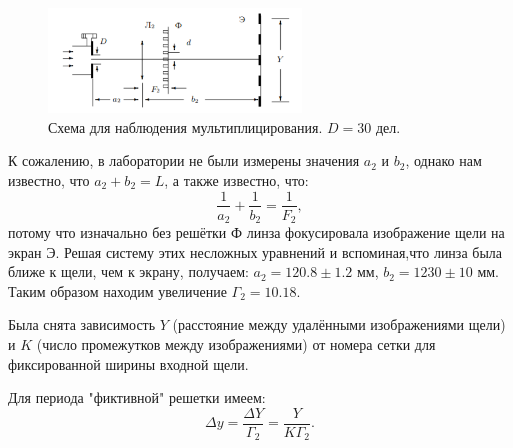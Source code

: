 \documentclass[a4paper, 14pt]{extarticle}%
\newcommand\ECaption[1]{%
     \captionsetup{font=footnotesize}%
     \caption{#1}}
\begin{document}
\begin{figure}[h!]
\begin{center}
\includegraphics[width=0.6\textwidth]{ust4}
\ECaption{Схема для наблюдения мультиплицирования. $D = 30$ дел. }
\end{center}
\end{figure}

К сожалению, в лаборатории не были измерены значения $a_2$ и $b_2$, однако нам известно, что $a_2+b_2=L$, а также известно, что:
\[\frac{1}{a_2}+\frac{1}{b_2}=\frac{1}{F_2},\]
потому что изначально без решётки Ф линза фокусировала изображение щели на экран Э. Решая систему этих несложных уравнений и вспоминая,что линза была ближе к щели, чем к экрану, получаем: $a_2=120.8 \pm 1.2$ мм, $b_2=1230 \pm 10$ мм. Таким образом находим увеличение $\Gamma_2 = 10.18$.

Была снята зависимость
$Y$ (расстояние между
удалёнными изображениями
щели)
и
$K$ (число промежутков между изображениями) от номера сетки для фиксированной ширины входной щели.

Для периода "фиктивной" решетки имеем:
\[\Delta y = \frac{\Delta Y}{\Gamma_2} = \frac{Y}{K\Gamma_2}.\]
\end{document}
